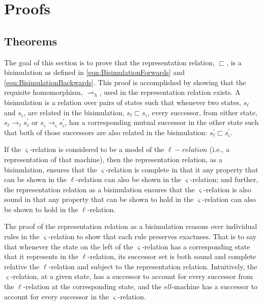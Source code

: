 \section{Proofs}




\subsection{Theorems}

The goal of this section is to prove that the representation relation,
$\sqsubset$, is a bisimulation as defined in
\eqref{eqn:BisimulationForwards} and
\eqref{eqn:BisimulationBackwards}. This proof is accomplished by
showing that the requisite homomorphism, $\rightharpoonup_h$, used in
the representation relation exists. A bisimulation is a relation over
pairs of states such that whenever two states, $s_\ell$ and
$s_\varsigma$, are related in the bisimulation, $s_\ell \sqsubset
s_\varsigma$, every successor, from either state, $s_\ell
\rightarrow_\ell s_\ell^\prime$ or $s_\varsigma \rightarrow_\varsigma
s_\varsigma^\prime$, has a corresponding mutual successor in the other
state such that both of those successors are also related in the
bisimulation: $s_\ell^\prime \sqsubset s_\varsigma^\prime$.

If the $\varsigma$-relation is considered to be a model of the
$\ell-relation$ (i.e., a representation of that machine), then the
representation relation, as a bisimulation, ensures that the
$\varsigma$-relation is complete in that it any property that can be
shown in the $\ell$-relation can also be shown in the
$\varsigma$-relation; and further, the representation relation as a
bisimulation ensures that the $\varsigma$-relation is also sound in
that any property that can be shown to hold in the $\varsigma$-relation
can also be shown to hold in the $\ell$-relation.

The proof of the representation relation as a bisimulation reasons
over individual rules in the $\varsigma$-relation to show that each
rule preserves exactness. That is to say that whenever the state on
the left of the $\varsigma$-relation has a corresponding state that it
represents in the $\ell$-relation, its successor set is both sound and
complete relative the $\ell$-relation and subject to the
representation relation. Intuitively, the $\varsigma$-relation, at a
given state, has a successor to account for every successor from the
$\ell$-relation at the corresponding state, and the $ell$-machine has
a successor to account for every successor in the
$\varsigma$-relation. 

